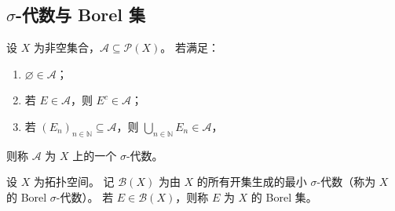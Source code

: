 \documentclass[lang=cn,a4paper,newtx,figureplace=section,tableplace=section]{elegantbook}
\begin{document}
\subsection{$\sigma$-代数与 Borel 集}

\begin{definition}[$\sigma$-代数]
  设 $X$ 为非空集合，$\mathcal{A}\subseteq\mathcal{P}(X)$。
  若满足：
  \begin{enumerate}
    \item $\varnothing\in\mathcal{A}$；
    \item 若 $E\in\mathcal{A}$，则 $E^c\in\mathcal{A}$；
    \item 若 $(E_n)_{n\in\mathbb{N}}\subseteq\mathcal{A}$，则 $\bigcup_{n\in\mathbb{N}}E_n\in\mathcal{A}$，
  \end{enumerate}
  则称 $\mathcal{A}$ 为 $X$ 上的一个 $\sigma$-代数。
\end{definition}

\begin{definition}
  设 $X$ 为拓扑空间。
  记 $\mathcal{B}(X)$ 为由 $X$ 的所有开集生成的最小 $\sigma$-代数（称为 $X$ 的 Borel $\sigma$-代数）。
  若 $E\in\mathcal{B}(X)$，则称 $E$ 为 $X$ 的 Borel 集。
\end{definition}
\end{document}
